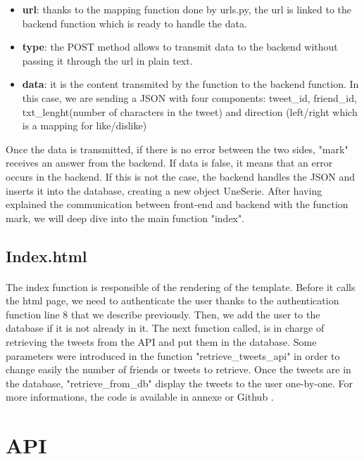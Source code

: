 \begin{itemize}
  \item \textbf{url}: thanks to the mapping function done by urls.py, the url is linked to the backend function which is ready to handle the data. 
  \item \textbf{type}: the POST method allows to transmit data to the backend without passing it through the url in plain text.
  \item \textbf{data}: it is the content transmited by the function to the backend function. In this case, we are sending a JSON with four components:  tweet\_id, friend\_id, txt\_lenght(number of characters in the tweet) and direction (left/right which is a mapping for like/dislike) 
\end{itemize}

Once the data is transmitted, if there is no error between the two sides, "mark" receives an answer from the backend. If data is false, it means that an error occurs in the backend. If this is not the case, the backend handles the JSON and inserts it into the database, creating a new object UneSerie. After having explained the communication between front-end and backend with the function mark, we will deep dive into the main function "index".

 \subsection{Index.html}
 
\paragraph{}
The index function is responsible of the rendering of the template. Before it calls the html page, we need to authenticate the user thanks to the authentication function line 8 that we describe previously. Then, we add the user to the database if it is not already in it. The next function called, is in charge of retrieving the tweets from the API and put them in the database. Some parameters were introduced in the function "retrieve\_tweets\_api" in order to change easily the number of friends or tweets to retrieve. Once the tweets are in the database, "retrieve\_from\_db" display the tweets to the user one-by-one.
For more informations, the code is available in annexe or Github \cite{tw_github} .

 \section{API}
 
